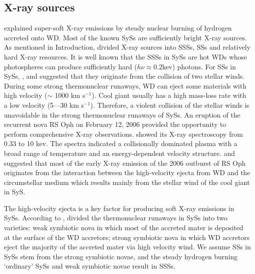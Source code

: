 \documentclass{elsart}
\begin{document}
\subsection{X-ray sources}
 \cite{v92} explained super-soft X-ray
emissions by steady nuclear burning of hydrogen accreted onto WD.
Most of the known SySs are sufficiently bright X-ray sources. As
mentioned in Introduction, \cite{mur97} divided X-ray sources into
SSSs, SSs and relatively hard X-ray resources. It is well known that
the SSSs in SySs are hot WDs whose photospheres can produce
sufficiently hard ($h\nu\approx0.2$kev) photons. For SSs in SySs,
\cite{jor94}, \cite{for95} and \cite{mur97} suggested that they
originate from the collision of two stellar winds. During some
strong thermonuclear runaways, WD can eject some materials with high
velocity ($\sim$ 1000 km s$^{-1}$). Cool giant usually has a high
mass-loss rate with a low velocity (5---30 km s$^{-1}$). Therefore,
a violent collision of the stellar winds is unavoidable in the
strong thermonuclear runaways of SySs. An eruption of the recurrent
nova RS Oph on February 12, 2006 provided the opportunity to perform
comprehensive X-ray observations. \cite{nel08} showed its X-ray
spectroscopy from 0.33 to 10 kev. The spectra indicated a
collisionally dominated plasma with a broad range of temperature and
an energy-dependent velocity structure.  \cite{sok06} and
\cite{orl08} suggested that most of the early X-ray emission of the
2006 outburst of RS Oph originates from the interaction between the
high-velocity ejecta from WD and the circumstellar medium which
results mainly from the stellar wind of the cool giant in SyS.

The high-velocity ejecta is a key factor for producing soft X-ray
emissions in SySs. According to \citet{yar05}, \cite{lu06} divided
the thermonuclear runaways in SySs into two varieties: weak
symbiotic nova in which most of the accreted mater is deposited at
the surface of the WD accretors; strong symbiotic nova in which WD
accretors eject the majority of the accreted mater via high velocity
wind.  We assume SSs in SySs stem from the strong symbiotic novae,
and the steady hydrogen burning `ordinary' SySs and weak symbiotic
novae result in SSSs.
\end{document}
